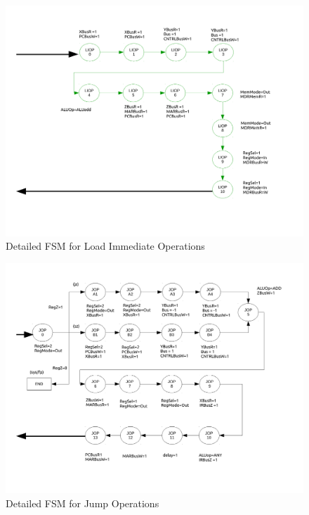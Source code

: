 \documentclass[conference]{IEEEtran}
\begin{document}
\begin{figure}[!t]
\centering
\includegraphics[width=\textwidth]{ControlFSMp4.pdf}
\caption{Detailed FSM for Load Immediate Operations}
\label{fig_sim}
\end{figure}

\clearpage

\begin{figure}[!t]
\centering
\includegraphics[width=\textwidth]{ControlFSMp5.pdf}
\caption{Detailed FSM for Jump Operations}
\label{fig_sim}
\end{figure}
\end{document}
